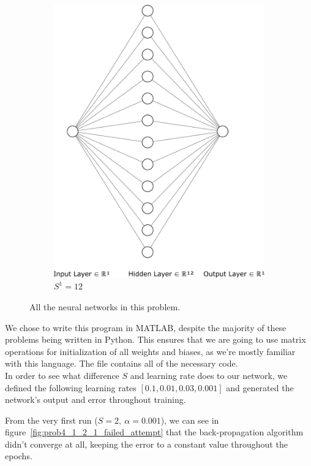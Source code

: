 \begin{figure}[H]
\begin{subfigure}{0.47\textwidth}
		\includegraphics[width=\textwidth]{../Problem 4/nn_1_12_1.pdf}
		\caption{$S^1=12$}
	\end{subfigure}
	\caption{All the neural networks in this problem.}
	\label{fig:prob4_nns}
\end{figure}

We chose to write this program in MATLAB, despite the majority of these problems being written in Python. This ensures that we are going to use matrix operations for initialization of all weights and biases, as we're mostly familiar with this language.
The file  contains all of the necessary code.\\

In order to see what difference $S$ and learning rate does to our network, we defined the following learning rates $\left[0.1, 0.01, 0.03, 0.001\right]$ and generated the network's output and error throughout training.

From the very first run ($S=2,\ \alpha=0.001$), we can see in figure~\ref{fig:prob4_1_2_1_failed_attempt} that the back-propagation algorithm didn't converge at all, keeping the error to a constant value throughout the epochs.

